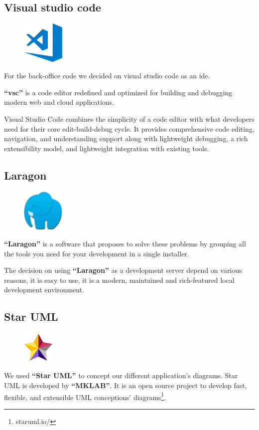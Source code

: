 \documentclass[12pt,a4paper]{report}
\begin{document}
	\subsection{Visual studio code}
	\begin{figure}
		\centering
		\includegraphics[width=0.8in]{vsc-logo.png}	
		
	\end{figure}
	For the back-office code we decided on visual studio code as an \ac{ide}.\par 
	\textbf{``\ac{vsc}''} is a code editor redefined and optimized for building and debugging modern web and cloud applications.\par 
	Visual Studio Code combines the simplicity of a code editor with what developers need for their core edit-build-debug cycle. It provides comprehensive code editing, navigation, and understanding support along with lightweight debugging, a rich extensibility model, and lightweight integration with existing tools.
	\subsection{Laragon}
	\begin{figure}
		\centering
		\includegraphics[width=0.8in]{laragonlogo.png}	
		
	\end{figure}
	\textbf{``Laragon''} is a software that proposes to solve these problems by grouping all the tools you need for your development in a single installer.\par 
	The decision on using \textbf{``Laragon''} as a development server depend on various reasons, it is easy to use, it is  a modern, maintained and rich-featured local development environment.

	\subsection{Star UML}
	\begin{figure}
		\centering
		\includegraphics[width=0.6in]{staruml.png}
	\end{figure}
	We used \textbf{``Star UML''} to concept our different application's diagrams. Star UML is developed by \textbf{``MKLAB''}. It is an open source project to develop fast, flexible, and extensible UML conceptions' diagrams\footnote{staruml.io/}.\\
	
\end{document}
